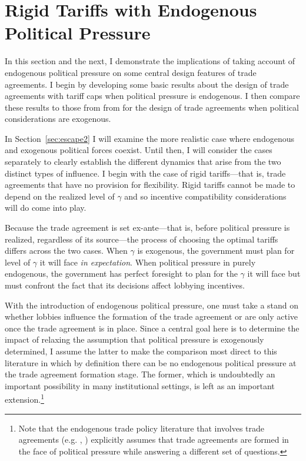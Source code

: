 \documentclass[12pt]{article}
\newcommand{\ga}{\gamma}
\begin{document}
\section{Rigid Tariffs with Endogenous Political Pressure}
\label{sec:rigid}
In this section and the next, I demonstrate the implications of taking account of endogenous political pressure on some central design features of trade agreements. I begin by developing some basic results about the design of trade agreements with tariff caps when political pressure is endogenous. I then compare these results to those from from \Textcite{bs2005} for the design of trade agreements when political considerations are exogenous.

In Section~\ref{sec:escape2} I will examine the more realistic case where endogenous and exogenous political forces coexist. Until then, I will consider the cases separately to clearly establish the different dynamics that arise from the two distinct types of influence. I begin with the case of rigid tariffs---that is, trade agreements that have no provision for flexibility. Rigid tariffs cannot be made to depend on the realized level of $\ga$ and so incentive compatibility considerations will do come into play.


Because the trade agreement is set ex-ante---that is, before political pressure is realized, regardless of its source---the process of choosing the optimal tariffs differs across the two cases. When $\ga$ is exogenous, the government must plan for level of $\ga$ it will face \textit{in expectation}. When political pressure in purely endogenous, the government has perfect foresight to plan for the $\ga$ it will face but must confront the fact that its decisions affect lobbying incentives.

With the introduction of endogenous political pressure, one must take a stand on whether lobbies influence the formation of the trade agreement or are only active once the trade agreement is in place. Since a central goal here is to determine the impact of relaxing the assumption that political pressure is exogenously determined, I assume the latter to make the comparison most direct to this literature in which by definition there can be no endogenous political pressure at the trade agreement formation stage. The former, which is undoubtedly an important possibility in many institutional settings, is left as an important extension.\footnote{Note that the endogenous trade policy literature that involves trade agreements (e.g. \Textcite{gh95}, \Textcite{mrc2007}) explicitly assumes that trade agreements are formed in the face of political pressure while answering a different set of questions.}
\end{document}
